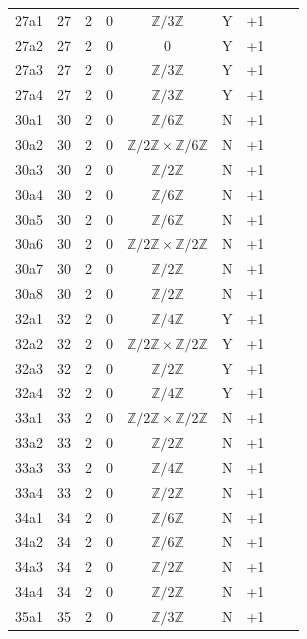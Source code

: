 \begin{table}[htbp]
\begin{tabular}{ccccccccc}
27a1 & 27 & 2 & 0 & $\mathbb{Z}/3\mathbb{Z}$ & Y & +1 &  &  \\
27a2 & 27 & 2 & 0 & 0 & Y & +1 &  &  \\
27a3 & 27 & 2 & 0 & $\mathbb{Z}/3\mathbb{Z}$ & Y & +1 &  &  \\
27a4 & 27 & 2 & 0 & $\mathbb{Z}/3\mathbb{Z}$ & Y & +1 &  &  \\
30a1 & 30 & 2 & 0 & $\mathbb{Z}/6\mathbb{Z}$ & N & +1 &  &  \\
30a2 & 30 & 2 & 0 & $\mathbb{Z}/2\mathbb{Z} \times \mathbb{Z}/6\mathbb{Z}$ & N & +1 &  &  \\
30a3 & 30 & 2 & 0 & $\mathbb{Z}/2\mathbb{Z}$ & N & +1 &  &  \\
30a4 & 30 & 2 & 0 & $\mathbb{Z}/6\mathbb{Z}$ & N & +1 &  &  \\
30a5 & 30 & 2 & 0 & $\mathbb{Z}/6\mathbb{Z}$ & N & +1 &  &  \\
30a6 & 30 & 2 & 0 & $\mathbb{Z}/2\mathbb{Z} \times \mathbb{Z}/2\mathbb{Z}$ & N & +1 &  &  \\
30a7 & 30 & 2 & 0 & $\mathbb{Z}/2\mathbb{Z}$ & N & +1 &  &  \\
30a8 & 30 & 2 & 0 & $\mathbb{Z}/2\mathbb{Z}$ & N & +1 &  &  \\
32a1 & 32 & 2 & 0 & $\mathbb{Z}/4\mathbb{Z}$ & Y & +1 &  &  \\
32a2 & 32 & 2 & 0 & $\mathbb{Z}/2\mathbb{Z} \times \mathbb{Z}/2\mathbb{Z}$ & Y & +1 &  &  \\
32a3 & 32 & 2 & 0 & $\mathbb{Z}/2\mathbb{Z}$ & Y & +1 &  &  \\
32a4 & 32 & 2 & 0 & $\mathbb{Z}/4\mathbb{Z}$ & Y & +1 &  &  \\
33a1 & 33 & 2 & 0 & $\mathbb{Z}/2\mathbb{Z} \times \mathbb{Z}/2\mathbb{Z}$ & N & +1 &  &  \\
33a2 & 33 & 2 & 0 & $\mathbb{Z}/2\mathbb{Z}$ & N & +1 &  &  \\
33a3 & 33 & 2 & 0 & $\mathbb{Z}/4\mathbb{Z}$ & N & +1 &  &  \\
33a4 & 33 & 2 & 0 & $\mathbb{Z}/2\mathbb{Z}$ & N & +1 &  &  \\
34a1 & 34 & 2 & 0 & $\mathbb{Z}/6\mathbb{Z}$ & N & +1 &  &  \\
34a2 & 34 & 2 & 0 & $\mathbb{Z}/6\mathbb{Z}$ & N & +1 &  &  \\
34a3 & 34 & 2 & 0 & $\mathbb{Z}/2\mathbb{Z}$ & N & +1 &  &  \\
34a4 & 34 & 2 & 0 & $\mathbb{Z}/2\mathbb{Z}$ & N & +1 &  &  \\
35a1 & 35 & 2 & 0 & $\mathbb{Z}/3\mathbb{Z}$ & N & +1 &  &  \\

\end{tabular}
\end{table}
